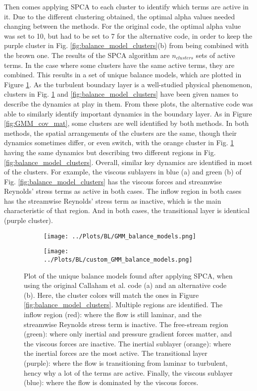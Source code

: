 \documentclass[12pt]{report} %
\begin{document}
Then comes applying SPCA to each cluster to identify which terms are active in it. Due to the different clustering obtained, the optimal alpha values needed changing between the methods. For the original code, the optimal alpha value was set to 10, but had to be set to 7 for the alternative code, in order to keep the purple cluster in Fig. \ref{fig:balance_model_clusters}(b) from being combined with the brown one. The results of the SPCA algorithm are $n_{clusters}$ sets of active terms. In the case where some clusters have the same active terms, they are combined. This results in a set of unique balance models, which are plotted in Figure \ref{fig:balance_models}. As the turbulent boundary layer is a well-studied physical phenomenon, clusters in Fig. \ref{fig:balance_models} and \ref{fig:balance_model_clusters} have been given names to describe the dynamics at play in them. From these plots, the alternative code was able to similarly identify important dynamics in the boundary layer. As in Figure \ref{fig:GMM_cov_mat}, some clusters are well identified by both methods. In both methods, the spatial arrangements of the clusters are the same, though their dynamics sometimes differ, or even switch, with the orange cluster in Fig. \ref{fig:balance_models} having the same dynamics but describing two different regions in Fig. \ref{fig:balance_model_clusters}. Overall, similar key dynamics are identified in most of the clusters. For example, the viscous sublayers in blue (a) and green (b) of Fig. \ref{fig:balance_model_clusters} has the viscous forces and streamwise Reynolds’ stress terms as active in both cases. The inflow region in both cases has the streamwise Reynolds’ stress term as inactive, which is the main characteristic of that region. And in both cases, the transitional layer is identical (purple cluster).


\begin{figure}[htbp]
  \centering
  \begin{subfigure}[b]{0.45\textwidth}
      \texttt{[image: ../Plots/BL/GMM\_balance\_models.png]}
      \caption{}
  \end{subfigure}
  \hfill
  \begin{subfigure}[b]{0.45\textwidth}
      \texttt{[image: ../Plots/BL/custom\_GMM\_balance\_models.png]}
      \caption{}
  \end{subfigure}
  \caption{Plot of the unique balance models found after applying SPCA, when using the original Callaham et al. code (a) and an alternative code (b). Here, the cluster colors will match the ones in Figure \ref{fig:balance_model_clusters}. Multiple regions are identified. The inflow region (red): where the flow is still laminar, and the streamwise Reynolds stress term is inactive. The free-stream region (green): where only inertial and pressure gradient forces matter, and the viscous forces are inactive. The inertial sublayer (orange): where the inertial forces are the most active. The transitional layer (purple): where the flow is transitioning from laminar to turbulent, hency why a lot of the terms are active. Finally, the viscous sublayer (blue): where the flow is dominated by the viscous forces.}
  \label{fig:balance_models}
\end{figure}
\end{document}
